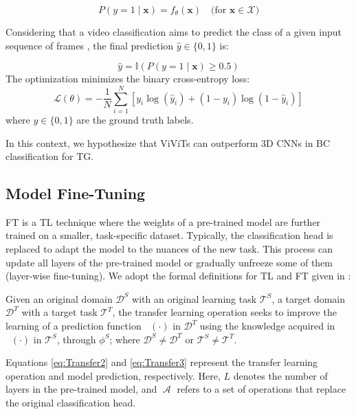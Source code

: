 \documentclass[runningheads]{llncs}
\DeclareMathOperator{\ypredtarget}{\phi^{T}}
\DeclareMathOperator{\ypredsource}{\phi^{S}}
\DeclareMathOperator{\ConvNetOut}{\mathcal{A}}
\begin{document}
\begin{equation}
    P(y = 1 \mid \mathbf{x}) = f_\theta(\mathbf{x}) \quad \text{(for $\mathbf{x} \in \mathcal{X}$)}
\end{equation}

Considering that a video classification aims to predict the class of a
given input sequence of frames \cite{Selva_2023}, the final prediction
$\hat{y} \in \{0,1\}$ is:

\begin{equation}
    \hat{y} = \mathbb{I}\left( P(y = 1 \mid \mathbf{x}) \geq 0.5 \right)
\end{equation}
The optimization  minimizes the binary cross-entropy loss:
\begin{equation}
    \mathcal{L}(\theta) = -\frac{1}{N}\sum_{i=1}^N \left[y_i\log(\hat{y}_i) + (1-y_i)\log(1-\hat{y}_i)\right]
\end{equation}
where $y \in \{0,1\}$ are the ground truth labels.

In this context, we hypothesize that  \ac{ViViTs} can outperform
3D \ac{CNNs} in \ac{BC} classification for \ac{TG}.


\subsection{Model Fine-Tuning}\label{sec:transfer-learnin}
\ac{FT} is a \ac{TL} technique where the weights of a pre-trained model are further trained on a smaller, task-specific dataset. Typically, the classification head is replaced to adapt the model to the nuances of the new task. This process can update all layers of the pre-trained model or gradually unfreeze some of them (layer-wise fine-tuning). We adopt the formal definitions for \ac{TL} and \ac{FT} given in \cite{falconi2020transfer}:

\begin{definition}
  Given an original domain $\mathcal{D}^{S}$ with an original learning task $\mathcal{T}^{S}$, a target domain $\mathcal{D}^{T}$ with a target task $\mathcal{T}^{T}$, the transfer learning operation seeks to improve the learning of a prediction function $\ypredtarget(\cdot)$ in $\mathcal{D}^{T}$ using the knowledge acquired in $\ypredsource(\cdot)$ in $\mathcal{T}^{S}$, through $\phi^S$; where $\mathcal{D}^{S} \neq \mathcal{D}^{T}$ or $\mathcal{T}^{S} \neq \mathcal{T}^{T}$.
\end{definition}

Equations \eqref{eq:Transfer2} and \eqref{eq:Transfer3} represent the transfer learning operation and model prediction, respectively. Here, $L$ denotes the number of layers in the pre-trained model, and $\ConvNetOut$ refers to a set of operations that replace the original classification head.
\end{document}
